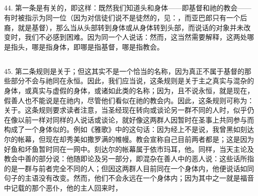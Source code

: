 
\subsection{}

44. 第一条是有关的，即这样：既然我们知道头和身体——即基督和祂的教会——有时被指示为同一位（因为对信徒们说不是徒然的，见：，而亚巴郎只有一个后裔，就是基督），那么当从头部转到身体或从身体转到头部，而说话的对象并未改变时，我们不必感到困难。因为同一个人说话：然而，这当然需要解释，这两处哪是指头，哪是指身体，即哪是指基督，哪是指教会。\par


\subsection{}

45. 第二条规则是关于；但这其实不是一个恰当的名称，因为真正不属于基督的那些部分不会与祂同在永恒。因此，我们应当说，这条规则是关于主之真实与混杂的身体，或真实与虚假的身体，或诸如此类的名称；因为，且不说永恒，就是现在，假善人也不能说是在祂内，尽管他们看似在祂的教会内。因此，这条规则可称为：关于。这条规则要求读者注意，当圣经现在转向或谈论另一群不同的人时，似乎仍在像以前一样对同样的人说话或谈论，就好像这两群人因暂时在圣事上共同参与而构成了一个身体似的。例如《雅歌》中的这句话：因为经上不是说，我曾黑如刻达尔的帐幕，但现在却秀美如撒罗满的帷幔。教会宣称自己目前两者都是；这是因为好鱼和坏鱼暂时同在一网中。刻达尔的帐幕属于依市玛耳，他。同样，当天主论及教会中善的部分说：他随即论及另一部分，即混杂在善人中的恶人说：这些话所指的是一群与前者完全不同的人；但因这两群人目前同在一个身体内，他便说话如同句子的主语没有改变。然而，他们不会永远在一个身体内；因为其中之一就是福音中记载的那个恶仆，他的主人回来时，\par

